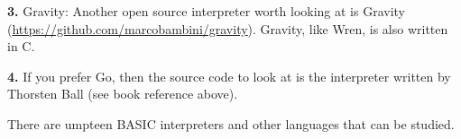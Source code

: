 {\bf 3.} Gravity:  Another open source interpreter worth looking at is Gravity (\url{https://github.com/marcobambini/gravity}). Gravity, like Wren, is also written in C.

{\bf 4.}  If you prefer Go, then the source code to look at is the interpreter written by Thorsten Ball (see book reference above).

There are umpteen BASIC interpreters and other languages that can be studied.

\bigskip\medskip

\begin{center}
\end{center} 